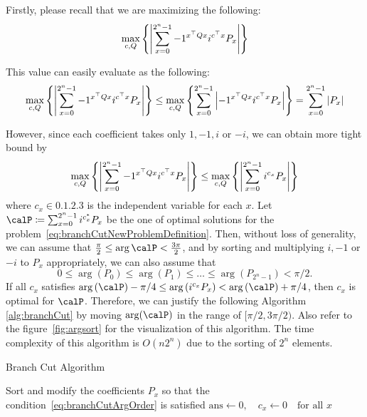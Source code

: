 \documentclass[\main/main]{subfiles}
\begin{document}
Firstly, please recall that we are maximizing the following:
\begin{equation*}
  \max_{c,Q} \qty{ \abs{\sum_{x=0}^{2^n-1} -1^{x^\top Q x} i^{c^\top x} P_x} }
\end{equation*}

This value can easily evaluate as the following:
\begin{equation*}
  \max_{c,Q} \qty{ \abs{\sum_{x=0}^{2^n-1} -1^{x^\top Q x} i^{c^\top x} P_x} }
  \leq \max_{c,Q} \qty{ \sum_{x=0}^{2^n-1} \abs{-1^{x^\top Q x} i^{c^\top x} P_x} }
  = \sum_{x=0}^{2^n-1} \abs{P_x}
\end{equation*}

However, since each coefficient takes only $1, -1, i$ or $-i$,
we can obtain more tight bound by
\begin{equation}\label{eq:branchCutNewProblemDefinition}
  \max_{c,Q} \qty{ \abs{\sum_{x=0}^{2^n-1} -1^{x^\top Q x} i^{c^\top x} P_x} }
  \leq \max_{c,Q} \qty{ \abs{\sum_{x=0}^{2^n-1} i^{c_x} P_x} }
\end{equation}
where $c_x \in \qty{0, 1, 2, 3}$ is the independent variable for each $x$.
Let $\calP \defeq \sum_{x=0}^{2^n-1} i^{c_x^*} P_x$ be
the one of optimal solutions for the problem~\eqref{eq:branchCutNewProblemDefinition}.
Then, without loss of generality,
we can assume that $\frac{\pi}{2} \leq \arg \calP < \frac{3\pi}{2}$,
and by sorting and multiplying $i,-1$ or $-i$ to $P_x$ appropriately,
we can also assume that
\begin{equation}\label{eq:branchCutArgOrder}
  0 \leq \arg{(P_0)} \leq \arg{(P_1)} \leq \dots \leq \arg{(P_{2^n-1})} < \pi/2.
\end{equation}
If all $c_x$ satisfies $\arg{(\calP)} - \pi/4 \leq \arg{\qty(i^{c_x} P_x)} < \arg{(\calP)} + \pi/4$,
then $c_x$ is optimal for $\calP$.
Therefore, we can justify the following Algorithm \ref{alg:branchCut}
by moving $\arg(\calP)$ in the range of $[\pi/2, 3\pi/2)$.
Also refer to the figure~\ref{fig:argsort} for the visualization of this algorithm.
The time complexity of this algorithm is $O(n2^n)$
due to the sorting of $2^n$ elements.

\begin{algorithm}
  \caption{Branch Cut Algorithm}
  \label{alg:branchCut}
  Sort and modify the coefficients $P_x$ so that the condition~\eqref{eq:branchCutArgOrder} is satisfied\;
  $\mathrm{ans} \leftarrow 0, \quad c_x \leftarrow 0 \quad \text{for all } x$\;
\end{algorithm}
\end{document}
